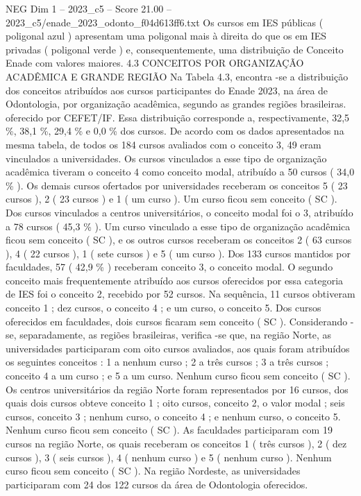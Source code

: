 \begin{textsample}{NEG Dim 1 – 2023\_c5 – Score 21.00 – 2023\_c5/enade\_2023\_odonto\_f04d613ff6.txt}
Os cursos em IES públicas ( poligonal azul ) apresentam uma poligonal mais à direita do que os em IES privadas ( poligonal verde ) e, consequentemente, uma distribuição de Conceito Enade com valores maiores. 4.3 CONCEITOS POR ORGANIZAÇÃO ACADÊMICA E GRANDE REGIÃO Na Tabela 4.3, encontra -se a distribuição dos conceitos atribuídos aos cursos participantes do Enade 2023, na área de Odontologia, por organização acadêmica, segundo as grandes regiões brasileiras. oferecido por CEFET/IF.
Essa distribuição corresponde a, respectivamente, 32,5 \%, 38,1 \%, 29,4 \% e 0,0 \% dos cursos.
De acordo com os dados apresentados na mesma tabela, de todos os 184 cursos avaliados com o conceito 3, 49 eram vinculados a universidades.
Os cursos vinculados a esse tipo de organização acadêmica tiveram o conceito 4 como conceito modal, atribuído a 50 cursos ( 34,0 \% ).
Os demais cursos ofertados por universidades receberam os conceitos 5 ( 23 cursos ), 2 ( 23 cursos ) e 1 ( um curso ).
Um curso ficou sem conceito ( SC ).
Dos cursos vinculados a centros universitários, o conceito modal foi o 3, atribuído a 78 cursos ( 45,3 \% ).
Um curso vinculado a esse tipo de organização acadêmica ficou sem conceito ( SC ), e os outros cursos receberam os conceitos 2 ( 63 cursos ), 4 ( 22 cursos ), 1 ( sete cursos ) e 5 ( um curso ).
Dos 133 cursos mantidos por faculdades, 57 ( 42,9 \% ) receberam conceito 3, o conceito modal.
O segundo conceito mais frequentemente atribuído aos cursos oferecidos por essa categoria de IES foi o conceito 2, recebido por 52 cursos.
Na sequência, 11 cursos obtiveram conceito 1 ; dez cursos, o conceito 4 ; e um curso, o conceito 5.
Dos cursos oferecidos em faculdades, dois cursos ficaram sem conceito ( SC ).
Considerando -se, separadamente, as regiões brasileiras, verifica -se que, na região Norte, as universidades participaram com oito cursos avaliados, aos quais foram atribuídos os seguintes conceitos : 1 a nenhum curso ; 2 a três cursos ; 3 a três cursos ; conceito 4 a um curso ; e 5 a um curso.
Nenhum curso ficou sem conceito ( SC ).
Os centros universitários da região Norte foram representados por 16 cursos, dos quais dois cursos obteve conceito 1 ; oito cursos, conceito 2, o valor modal ; seis cursos, conceito 3 ; nenhum curso, o conceito 4 ; e nenhum curso, o conceito 5.
Nenhum curso ficou sem conceito ( SC ).
As faculdades participaram com 19 cursos na região Norte, os quais receberam os conceitos 1 ( três cursos ), 2 ( dez cursos ), 3 ( seis cursos ), 4 ( nenhum curso ) e 5 ( nenhum curso ).
Nenhum curso ficou sem conceito ( SC ).
Na região Nordeste, as universidades participaram com 24 dos 122 cursos da área de Odontologia oferecidos.

\end{textsample}
